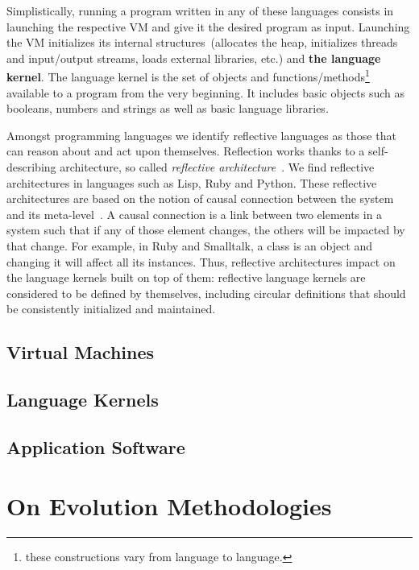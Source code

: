 Simplistically, running a program written in any of these languages consists in launching the respective VM and give it the desired program as input. Launching the VM initializes its internal structures~(\ie allocates the heap, initializes threads and input/output streams, loads external libraries, etc.) and \textbf{the language kernel}. The language kernel is the set of objects and functions/methods\footnote{these constructions vary from language to language.} available to a program from the very beginning. It includes basic objects such as booleans, numbers and strings as well as basic language libraries.

Amongst programming languages we identify reflective languages as those that can reason about and act upon themselves. Reflection works thanks to a self-describing architecture, so called \emph{reflective architecture}~\cite{Smit84a}. We find reflective architectures in languages such as \eg Lisp, Ruby and Python. These reflective architectures are based on the notion of causal connection between the system and its meta-level~\cite{Maes87a}. A causal connection is a link between two elements in a system such that if any of those element changes, the others will be impacted by that change. For example, in Ruby and Smalltalk, a class is an object and changing it will affect all its instances. Thus, reflective architectures impact on the language kernels built on top of them: reflective language kernels are considered to be defined by themselves, including circular definitions that should be consistently initialized and maintained.

\subsection{Virtual Machines}

\subsection{Language Kernels}

\subsection{Application Software}

\section{On Evolution Methodologies}


